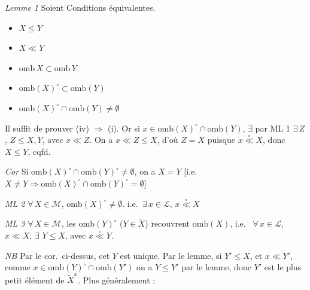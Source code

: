 \documentclass[11pt,a4paper]{article}
\begin{document}
\emph{Lemme 1} Soient  \ill{} Conditions équivalentes.
\begin{itemize}
  \item[(i)] $X \leq Y$
  \item[(ii)] $X \ll Y$
  \item[(ii bis)] $\mathrm{omb}\, X \subset \mathrm{omb}\, Y$
  \item[(iii)] $\mathrm{omb}(X)^{\circ} \subset \mathrm{omb}(Y)$
  \item[(iv)] $\mathrm{omb}(X)^{\circ} \cap \mathrm{omb}(Y) \neq \emptyset$
\end{itemize}

Il suffit de prouver (iv) $\Longrightarrow$ (i). Or si $x \in \mathrm{omb}(X)^{\circ} \cap \mathrm{omb}(Y)$, $\exists$ par ML 1 $\exists\, Z$, $Z \leq X, Y$, avec $x \ll Z$. On a $x \ll Z \leq X$, d'où $Z = X$ puisque $x \mathrel{\overset{\circ}{\ll}} X$, donc $X \leq Y$, cqfd.

\emph{Cor} Si $\mathrm{omb}(X)^{\circ} \cap \mathrm{omb}(Y)^{\circ} \neq \emptyset$, on a $X = Y$ [i.e.\ $X \neq Y \Rightarrow \mathrm{omb}(X)^{\circ} \cap \mathrm{omb}(Y)^{\circ} = \emptyset$]

\emph{ML 2} \quad $\forall\, X \in \mathcal{M}$, $\mathrm{omb}(X)^{\circ} \neq \emptyset$. i.e.\ $\exists\, x \in \mathcal{L}$, $x \mathrel{\overset{\circ}{\ll}} X$

\emph{ML 3} \quad $\forall\, X \in \mathcal{M}$, les $\mathrm{omb}(Y)^{\circ}$ ($Y \in \widetilde{X}$) recouvrent $\mathrm{omb}(X)$, i.e.\ \struck{$\forall$} $\forall\, x \in \mathcal{L}$, $x \ll X$, $\exists$  $Y \leq X$, avec $x \mathrel{\overset{\circ}{\ll}} Y$.

\emph{NB} Par le cor.\ ci-dessus, cet $Y$ est unique. Par le lemme, si  $Y' \leq X$, et $x \ll Y'$, comme $x \in \mathrm{omb}(Y)^{\circ} \cap \mathrm{omb}(Y')$ \ill{} on a $Y \leq Y'$ par le lemme, donc $Y'$ est le plus petit élément de $\widetilde{X}^{x}$. Plus généralement :
\end{document}

